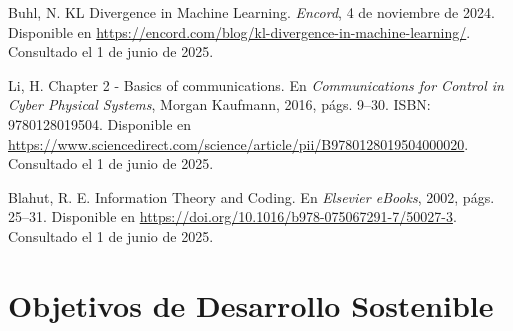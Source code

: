 \documentclass[11pt,spanish,listoffigures,listoftables]{tfgetsinf}
\begin{document}
\begin{thebibliography}{99}
   Buhl, N.  
   \newblock KL Divergence in Machine Learning.  
   \newblock \textit{Encord}, 4 de noviembre de 2024.  
   \newblock Disponible en  
   \url{https://encord.com/blog/kl-divergence-in-machine-learning/}.  
   \newblock Consultado el 1 de junio de 2025.

   Li, H.  
   \newblock Chapter 2 - Basics of communications.  
   \newblock En \textit{Communications for Control in Cyber Physical Systems}, Morgan Kaufmann, 2016, págs. 9--30.  
   \newblock ISBN: 9780128019504.  
   \newblock Disponible en  
   \url{https://www.sciencedirect.com/science/article/pii/B9780128019504000020}.  
   \newblock Consultado el 1 de junio de 2025.

   Blahut, R. E.  
   \newblock Information Theory and Coding.  
   \newblock En \textit{Elsevier eBooks}, 2002, págs. 25--31.  
   \newblock Disponible en  
   \url{https://doi.org/10.1016/b978-075067291-7/50027-3}.  
   \newblock Consultado el 1 de junio de 2025.

   

\end{thebibliography}
\cleardoublepage


\APPENDIX


\chapter{Objetivos de Desarrollo Sostenible}
\end{document}

